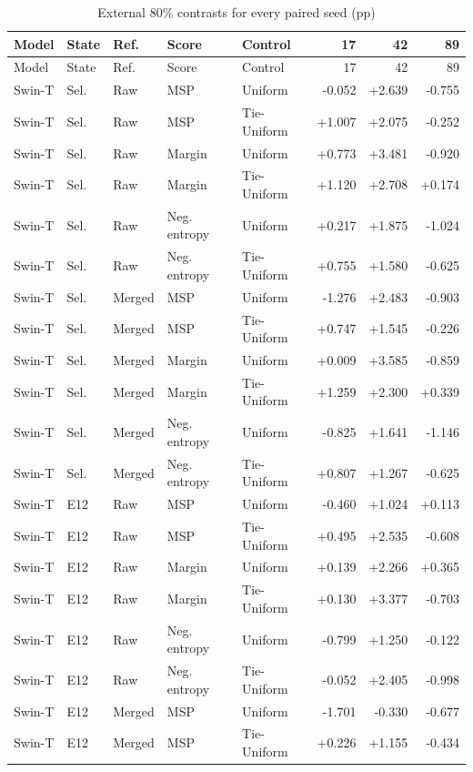 \documentclass[10pt]{article}
\begin{document}
\clearpage
\begin{longtable}{lllllrrr}
\caption{External 80\% contrasts for every paired seed (pp)}\\
\toprule Model & State & Ref. & Score & Control & 17 & 42 & 89\\\midrule\endfirsthead
\toprule Model & State & Ref. & Score & Control & 17 & 42 & 89\\\midrule\endhead
Swin-T & Sel. & Raw & MSP & Uniform & -0.052 & +2.639 & -0.755\\
Swin-T & Sel. & Raw & MSP & Tie-Uniform & +1.007 & +2.075 & -0.252\\
Swin-T & Sel. & Raw & Margin & Uniform & +0.773 & +3.481 & -0.920\\
Swin-T & Sel. & Raw & Margin & Tie-Uniform & +1.120 & +2.708 & +0.174\\
Swin-T & Sel. & Raw & Neg. entropy & Uniform & +0.217 & +1.875 & -1.024\\
Swin-T & Sel. & Raw & Neg. entropy & Tie-Uniform & +0.755 & +1.580 & -0.625\\
Swin-T & Sel. & Merged & MSP & Uniform & -1.276 & +2.483 & -0.903\\
Swin-T & Sel. & Merged & MSP & Tie-Uniform & +0.747 & +1.545 & -0.226\\
Swin-T & Sel. & Merged & Margin & Uniform & +0.009 & +3.585 & -0.859\\
Swin-T & Sel. & Merged & Margin & Tie-Uniform & +1.259 & +2.300 & +0.339\\
Swin-T & Sel. & Merged & Neg. entropy & Uniform & -0.825 & +1.641 & -1.146\\
Swin-T & Sel. & Merged & Neg. entropy & Tie-Uniform & +0.807 & +1.267 & -0.625\\
Swin-T & E12 & Raw & MSP & Uniform & -0.460 & +1.024 & +0.113\\
Swin-T & E12 & Raw & MSP & Tie-Uniform & +0.495 & +2.535 & -0.608\\
Swin-T & E12 & Raw & Margin & Uniform & +0.139 & +2.266 & +0.365\\
Swin-T & E12 & Raw & Margin & Tie-Uniform & +0.130 & +3.377 & -0.703\\
Swin-T & E12 & Raw & Neg. entropy & Uniform & -0.799 & +1.250 & -0.122\\
Swin-T & E12 & Raw & Neg. entropy & Tie-Uniform & -0.052 & +2.405 & -0.998\\
Swin-T & E12 & Merged & MSP & Uniform & -1.701 & -0.330 & -0.677\\
Swin-T & E12 & Merged & MSP & Tie-Uniform & +0.226 & +1.155 & -0.434\\

\end{longtable}
\end{document}
